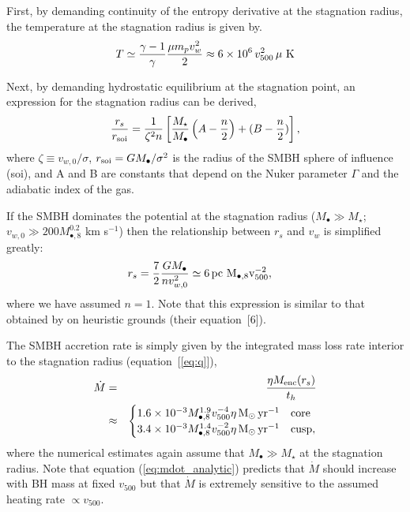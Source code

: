 \documentclass[usenatbib,fleqn]{mn2e}
\newcommand{\rs}{r_s}
\newcommand{\pc}{\rm pc}
\newcommand{\Menc}{M_{\rm enc}}
\newcommand{\Mstar}{M_{\star}}
\newcommand{\Mbh}[1][]{M_{\bullet#1}}
\newcommand{\Mbheight}{M_{\bullet,8}}
\newcommand{\soi}{\rm soi}
\newcommand{\rsoi}{r_{\soi}}
\newcommand{\vwO}{v_{w,0}}
\newcommand{\x}{\frac{r_s}{\rsoi}}
\newcommand{\pyear}{{\rm yr}^{-1}}
\renewcommand{\th}{t_h}
\begin{document}
First, by demanding continuity of the entropy derivative at the stagnation radius, the temperature at the stagnation radius is given by.
\begin{align}
T \simeq \frac{\gamma-1}{\gamma}\frac{\mu m_p v_{w}^{2}}{2} \approx 6
\times 10^6\,v_{500}^2 \, \mu  \,\,{\rm K} 
\label{eq:Tanalytic}
\end{align}

Next, by demanding hydrostatic equilibrium at the stagnation point, an expression for the stagnation radius can be derived,
\begin{align}
  \x=\frac{1}{\zeta^2 n}\left[
    \frac{\Mstar}{\Mbh}\left(A-\frac{n}{2}\right)+(B-\frac{n}{2})\right],
  \label{eq:stag_analytic}
\end{align}
where $\zeta \equiv v_{w,0}/\sigma$, $r_{\rm soi}
=GM_{\bullet}/\sigma^{2}$ is the radius of the SMBH sphere of
influence (soi), and A and B are constants that depend on the Nuker
parameter $\Gamma$ and the adiabatic index of the gas.

If the SMBH dominates the potential at the stagnation radius
($M_{\bullet} \gg M_{\star}$; $v_{w,0} \gg 200 M_{\bullet,8}^{0.2}$ km
s$^{-1}$) then the relationship between $\rs$ and $v_{w}$ is
simplified greatly:
\begin{align}
  &\rs=\frac{7}{2}\frac{G \Mbh}{n \vwO^2} \simeq 6 \, \pc \,\, \Mbheight v_{500}^{-2},
  \label{eq:stag_simple}
\end{align}
where we have assumed $n = 1$.  Note that this expression is similar to that
obtained by \citet{Volonteri+11} on heuristic grounds (their equation~[6]).

The SMBH accretion rate is simply given by the integrated mass loss rate interior to the stagnation radius (equation~[\ref{eq:q}]), 
\begin{eqnarray}
  \dot{M} &=& \frac{\eta \Menc(\rs)}{\th} \nonumber \\
&\approx&
  \begin{cases}
    1.6 \times 10^{-3}  M_{\bullet,8}^{1.9}
    v_{500}^{-4}  \eta \Msun \, \pyear& \text{core} \\
    3.4 \times 10^{-3} \Mbheight^{1.4}
    v_{500}^{-2}  \eta \Msun \, \pyear  & \text{cusp}, 
  \end{cases}
  \label{eq:mdot_analytic}
\end{eqnarray}
where the numerical estimates again assume that $M_{\bullet} \gg M_{\star}$ at the stagnation radius.  Note that equation (\ref{eq:mdot_analytic}) predicts that $\dot{M}$ should increase with BH mass at fixed $v_{500}$ but that $\dot{M}$ is extremely sensitive to the assumed heating rate $\propto v_{500}$.
\end{document}
